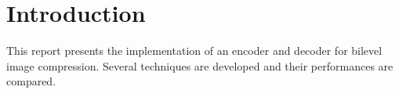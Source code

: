 \section{Introduction}

This report presents the implementation of an encoder and decoder for bilevel image compression. Several techniques are developed and their performances are compared.